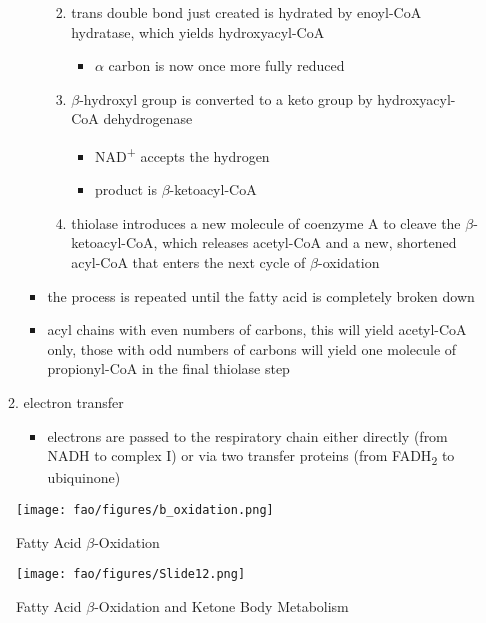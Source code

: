 \documentclass[12pt]{scrartcl}
\begin{document}
\begin{itemize}
\begin{enumerate}
\begin{itemize}
\begin{enumerate}
\begin{itemize}
\end{itemize}
\item trans double bond just created is hydrated by enoyl-CoA
hydratase, which yields hydroxyacyl-CoA
\begin{itemize}
\item \(\alpha\) carbon is now once more fully reduced
\end{itemize}
\item \(\beta\)-hydroxyl group is converted to a keto group by
hydroxyacyl-CoA dehydrogenase
\begin{itemize}
\item NAD\textsuperscript{+} accepts the hydrogen
\item product is \(\beta\)-ketoacyl-CoA
\end{itemize}
\item thiolase introduces a new molecule of coenzyme A to cleave
the \(\beta\)-ketoacyl-CoA, which releases acetyl-CoA and a new,
shortened acyl-CoA that enters the next cycle of
\(\beta\)-oxidation
\end{enumerate}
\item the process is repeated until the fatty acid is completely
broken down
\item acyl chains with even numbers of carbons, this will yield
acetyl-CoA only, those with odd numbers of carbons will yield
one molecule of propionyl-CoA in the final thiolase step
\end{itemize}
\item electron transfer
\begin{itemize}
\item electrons are passed to the respiratory chain either directly
(from NADH to complex I) or via two transfer proteins (from
FADH\textsubscript{2} to ubiquinone)
\end{itemize}
\end{enumerate}
\end{itemize}

\begin{figure}[htbp]
\centering
\texttt{[image: fao/figures/b\_oxidation.png]}
\caption{\label{fig:org67c0b82}Fatty Acid \(\beta\)-Oxidation}
\end{figure}

\begin{figure}[htbp]
\centering
\texttt{[image: fao/figures/Slide12.png]}
\caption{\label{fig:orga6de742}Fatty Acid \(\beta\)-Oxidation and Ketone Body Metabolism}
\end{figure}
\end{document}
